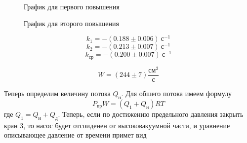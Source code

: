 \documentclass[a4paper,12pt]{article}
\begin{document}
    \begin{figure}[!ht]
		\caption{График для первого повышения}
	\end{figure}

    \begin{figure}[!ht]
		\caption{График для второго повышения}
	\end{figure}

    \[ k_1 = -(0.188 \pm 0.006) ~  с^{-1} \] 
    \[ k_2 = -(0.213 \pm 0.007) ~  с^{-1} \] 
    \[ k_{ср} = -(0.200 \pm 0.007) ~  с^{-1} \] 

    \begin{equation}
        W = (244 \pm 7)\frac{см^3}{с}
    \end{equation}

    Теперь определим величину потока $Q_н$. Для обшего потока имеем формулу
    \begin{equation}
        P_{пр}W = (Q_1 + Q_н)RT
    \end{equation}
    где $Q_1 = Q_и + Q_д$. Теперь, если по достижению предельного давления закрыть кран 3, то насос будет отсоиденен от высоковакуумной части, и уравнение описывающее давление от времени примет вид
\end{document}
